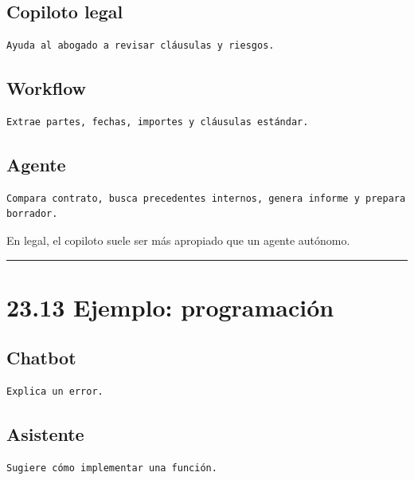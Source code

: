 \subsection{Copiloto legal}\label{copiloto-legal}

\begin{lstlisting}
Ayuda al abogado a revisar cláusulas y riesgos.
\end{lstlisting}

\subsection{Workflow}\label{workflow-2}

\begin{lstlisting}
Extrae partes, fechas, importes y cláusulas estándar.
\end{lstlisting}

\subsection{Agente}\label{agente-3}

\begin{lstlisting}
Compara contrato, busca precedentes internos, genera informe y prepara borrador.
\end{lstlisting}

En legal, el copiloto suele ser más apropiado que un agente autónomo.

\begin{center}\rule{0.5\linewidth}{0.5pt}\end{center}

\section{23.13 Ejemplo: programación}\label{ejemplo-programaciuxf3n}

\subsection{Chatbot}\label{chatbot-4}

\begin{lstlisting}
Explica un error.
\end{lstlisting}

\subsection{Asistente}\label{asistente-2}

\begin{lstlisting}
Sugiere cómo implementar una función.
\end{lstlisting}

